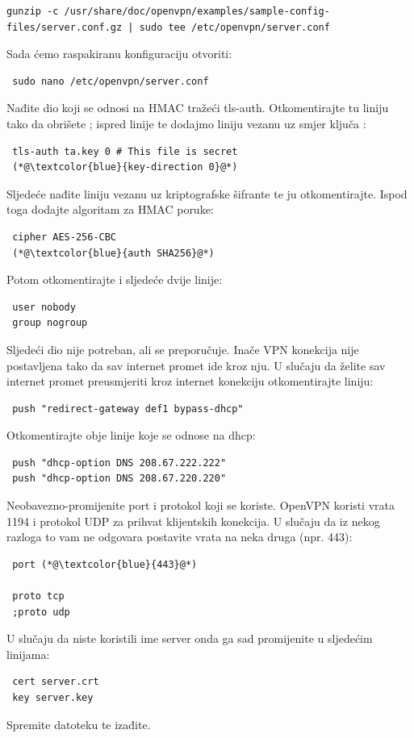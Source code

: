 \begin{lstlisting}[basicstyle=\tiny]
 gunzip -c /usr/share/doc/openvpn/examples/sample-config-files/server.conf.gz | sudo tee /etc/openvpn/server.conf
\end{lstlisting}
Sada ćemo raspakiranu konfiguraciju otvoriti:
\begin{lstlisting}
 sudo nano /etc/openvpn/server.conf
\end{lstlisting}
Nađite dio koji se odnosi na HMAC tražeći tls-auth. Otkomentirajte tu liniju tako da obrišete ; ispred linije te dodajmo liniju vezanu uz smjer ključa : 
\begin{lstlisting}
 tls-auth ta.key 0 # This file is secret
 (*@\textcolor{blue}{key-direction 0}@*)
\end{lstlisting}
Sljedeće nađite liniju vezanu uz kriptografske šifrante  te ju otkomentirajte. Ispod toga dodajte algoritam za HMAC poruke:
\begin{lstlisting}
 cipher AES-256-CBC
 (*@\textcolor{blue}{auth SHA256}@*)
\end{lstlisting}
Potom otkomentirajte i sljedeće dvije linije:
\begin{lstlisting}
 user nobody
 group nogroup
\end{lstlisting}
Sljedeći dio nije potreban, ali se preporučuje. Inače VPN konekcija nije postavljena tako da sav internet promet ide kroz nju. U slučaju da želite sav internet promet preusmjeriti kroz internet konekciju otkomentirajte liniju:
\begin{lstlisting}
 push "redirect-gateway def1 bypass-dhcp"
\end{lstlisting}
Otkomentirajte obje linije koje se odnose na dhcp:
\begin{lstlisting}
 push "dhcp-option DNS 208.67.222.222"
 push "dhcp-option DNS 208.67.220.220"
\end{lstlisting}
Neobavezno-promijenite port i protokol koji se koriste. OpenVPN koristi vrata 1194 i protokol UDP za prihvat klijentskih konekcija. U slučaju da iz nekog razloga to vam ne odgovara postavite vrata na neka druga (npr. 443):
\begin{lstlisting}
 port (*@\textcolor{blue}{443}@*)
 
 proto tcp
 ;proto udp
\end{lstlisting}
U slučaju da niste koristili ime server onda ga sad promijenite u sljedećim linijama:
\begin{lstlisting}
 cert server.crt
 key server.key
\end{lstlisting}
Spremite datoteku te izađite.
\bigbreak
